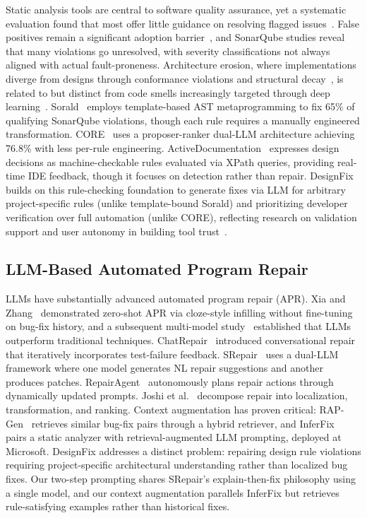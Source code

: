 \documentclass[conference]{IEEEtran}
\begin{document}
Static analysis tools are central to software quality assurance, yet a systematic evaluation found that most offer little guidance on resolving flagged issues~\cite{nachtigall2022usability}. False positives remain a significant adoption barrier~\cite{guo2023falsepositive}, and SonarQube studies reveal that many violations go unresolved, with severity classifications not always aligned with actual fault-proneness. Architecture erosion, where implementations diverge from designs through conformance violations and structural decay~\cite{li2022erosion}, is related to but distinct from code smells increasingly targeted through deep learning~\cite{liu2023deepsmell}. Sorald~\cite{etemadi2022sorald} employs template-based AST metaprogramming to fix 65\% of qualifying SonarQube violations, though each rule requires a manually engineered transformation. CORE~\cite{wadhwa2024core} uses a proposer-ranker dual-LLM architecture achieving 76.8\% with less per-rule engineering. ActiveDocumentation~\cite{mehrpour2019active} expresses design decisions as machine-checkable rules evaluated via XPath queries, providing real-time IDE feedback, though it focuses on detection rather than repair. DesignFix builds on this rule-checking foundation to generate fixes via LLM for arbitrary project-specific rules (unlike template-bound Sorald) and prioritizing developer verification over full automation (unlike CORE), reflecting research on validation support and user autonomy in building tool trust~\cite{johnson2023trust}.

\subsection{LLM-Based Automated Program Repair}

LLMs have substantially advanced automated program repair (APR). Xia and Zhang~\cite{xia2022alpharepair} demonstrated zero-shot APR via cloze-style infilling without fine-tuning on bug-fix history, and a subsequent multi-model study~\cite{xia2023era} established that LLMs outperform traditional techniques. ChatRepair~\cite{xia2024chatrepair} introduced conversational repair that iteratively incorporates test-failure feedback. SRepair~\cite{xiang2024srepair} uses a dual-LLM framework where one model generates NL repair suggestions and another produces patches.  RepairAgent~\cite{bouzenia2025repairagent} autonomously plans repair actions through dynamically updated prompts.  Joshi et al.~\cite{joshi2023ring} decompose repair into localization, transformation, and ranking. Context augmentation has proven critical: RAP-Gen~\cite{wang2023rapgen} retrieves similar bug-fix pairs through a hybrid retriever, and InferFix~\cite{jin2023inferfix} pairs a static analyzer with retrieval-augmented LLM prompting, deployed at Microsoft.
DesignFix addresses a distinct problem: repairing design rule violations requiring project-specific architectural understanding rather than localized bug fixes. Our two-step prompting shares SRepair's explain-then-fix philosophy using a single model, and our context augmentation parallels InferFix but retrieves rule-satisfying examples rather than historical fixes.
\end{document}
